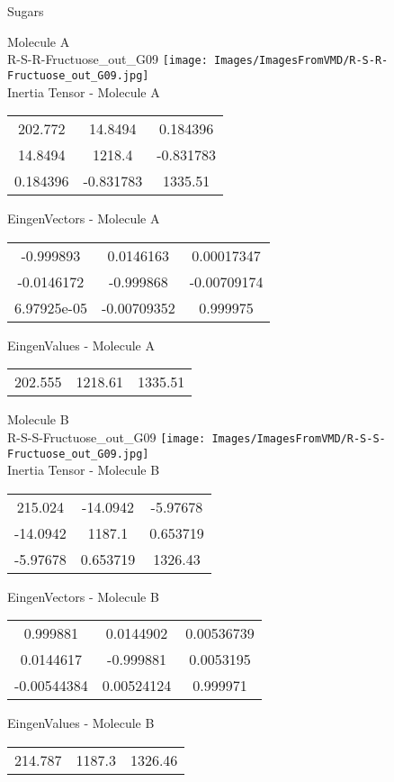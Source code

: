 \vtab[-2cm]
\begin{center}
{\large Sugars}
\end{center}
\begin{multicols}{2}
\begin{center}
Molecule A \\ 
R-S-R-Fructuose\_out\_G09
\texttt{[image: Images/ImagesFromVMD/R-S-R-Fructuose\_out\_G09.jpg]}
\\
Inertia Tensor - Molecule A \\
\vtab
\begin{tabular}{|c c c|}
202.772	 & 	14.8494	 & 	0.184396	 \\
14.8494	 & 	1218.4	 & 	-0.831783	 \\
0.184396	 & 	-0.831783	 & 	1335.51
\end{tabular}

\vtab
 EingenVectors - Molecule A     \\
\vtab
\begin{tabular}{|c c c|}
-0.999893	 & 	0.0146163	 & 	0.00017347	 \\
-0.0146172	 & 	-0.999868	 & 	-0.00709174	 \\
6.97925e-05	 & 	-0.00709352	 & 	0.999975
\end{tabular}

\vtab
 EingenValues - Molecule A     \\
\vtab
\begin{tabular}{|c c c|}
202.555	 & 	1218.61	 & 	1335.51
\end{tabular}
\columnbreak

Molecule B \\ 
R-S-S-Fructuose\_out\_G09
\texttt{[image: Images/ImagesFromVMD/R-S-S-Fructuose\_out\_G09.jpg]}
\\
Inertia Tensor - Molecule B \\
\vtab
\begin{tabular}{|c c c|}
215.024	 & 	-14.0942	 & 	-5.97678	 \\
-14.0942	 & 	1187.1	 & 	0.653719	 \\
-5.97678	 & 	0.653719	 & 	1326.43
\end{tabular}

\vtab
 EingenVectors - Molecule B     \\
\vtab
\begin{tabular}{|c c c|}
0.999881	 & 	0.0144902	 & 	0.00536739	 \\
0.0144617	 & 	-0.999881	 & 	0.0053195	 \\
-0.00544384	 & 	0.00524124	 & 	0.999971
\end{tabular}

\vtab
 EingenValues - Molecule B     \\
\vtab
\begin{tabular}{|c c c|}
214.787	 & 	1187.3	 & 	1326.46
\end{tabular}

\end{center}
\end{multicols}
